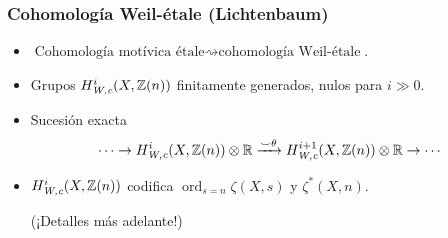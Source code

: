 \documentclass[handout]{beamer}
\newcommand{\FF}{\mathbb{F}}
\newcommand{\RR}{\mathbb{R}}
\newcommand{\ZZ}{\mathbb{Z}}
\DeclareMathOperator{\Gal}{Gal}
\DeclareMathOperator{\ord}{ord}
\newcommand{\et}{\text{\it ét}}
\newcommand{\Wc}{\text{\it W,c}}
\begin{document}

\begin{frame}
  \frametitle{Cohomología Weil-étale (Lichtenbaum)}

  \begin{itemize}
  \item<2-> $\text{Cohomología motívica étale} \rightsquigarrow
    \text{cohomología Weil-étale}$.

  \item<3-> Grupos $H^i_\Wc (X,\ZZ(n))$ finitamente generados, nulos para
    $i \gg 0$.

  \item<4-> Sucesión exacta
    $$\cdots \to H^i_\Wc (X,\ZZ(n)) \otimes \RR \xrightarrow{\smile\theta} H^{i+1}_\Wc (X,\ZZ(n)) \otimes \RR \to \cdots$$

  \item<5-> $H^i_\Wc (X, \ZZ(n))$ codifica $\ord_{s=n} \zeta (X,s)$ y $\zeta^* (X,n)$.

    (¡Detalles más adelante!)



  \end{itemize}
\end{frame}

\end{document}
